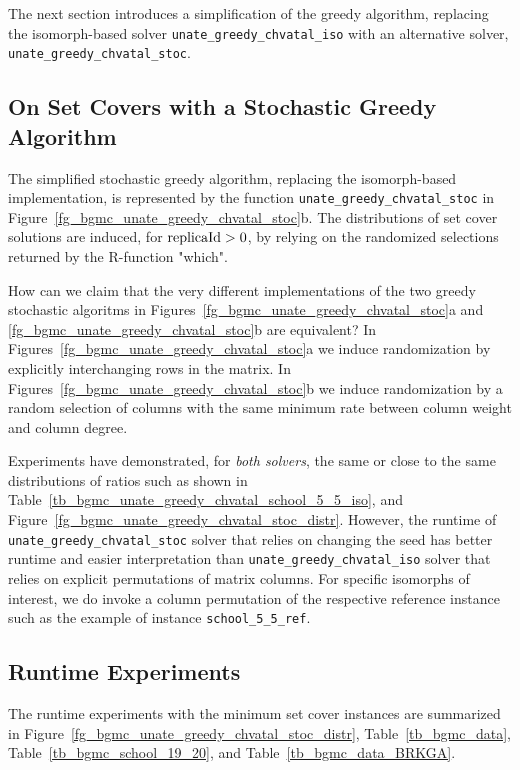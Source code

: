 The next section 
introduces a simplification of the greedy algorithm, 
replacing the isomorph-based solver  
{\tt unate\_greedy\_chvatal\_iso}
with an alternative solver,
{\tt unate\_greedy\_chvatal\_stoc}.

%
\subsection{{\sf On Set Covers with a Stochastic Greedy Algorithm}}
\noindent
The simplified stochastic greedy algorithm, 
replacing the isomorph-based implementation,
is represented by the function
{\tt unate\_greedy\_chvatal\_stoc} 
in Figure~\ref{fg_bgmc_unate_greedy_chvatal_stoc}b.
The distributions of set cover solutions are induced,
for ${\rm replicaId} > 0$, 
by relying on the randomized selections returned by the R-function "which".

How can we claim that the very different implementations 
of the two greedy stochastic algoritms in 
Figures~\ref{fg_bgmc_unate_greedy_chvatal_stoc}a and 
\ref{fg_bgmc_unate_greedy_chvatal_stoc}b are equivalent?
In Figures~\ref{fg_bgmc_unate_greedy_chvatal_stoc}a 
we induce randomization by explicitly interchanging rows
in the matrix.
In Figures~\ref{fg_bgmc_unate_greedy_chvatal_stoc}b
we induce randomization by a random selection of columns 
with the same minimum rate between column weight and column degree.

Experiments have demonstrated, for {\em both solvers}, 
the same or close to the same distributions
of ratios such as shown in 
Table~\ref{tb_bgmc_unate_greedy_chvatal_school_5_5_iso},
and
Figure~\ref{fg_bgmc_unate_greedy_chvatal_stoc_distr}.
However, the runtime of 
{\tt unate\_greedy\_chvatal\_stoc} solver that relies on changing the seed
has better  runtime and easier interpretation than
{\tt unate\_greedy\_chvatal\_iso} solver that
relies on explicit permutations of matrix columns.
For specific isomorphs of interest, 
we do invoke a column permutation of
the respective reference instance such as
the example of instance {\tt school\_5\_5\_ref}.
%
%
\subsection{{\sf Runtime Experiments}}
\noindent
The runtime experiments with the minimum set cover instances are summarized in
Figure~\ref{fg_bgmc_unate_greedy_chvatal_stoc_distr},
Table~\ref{tb_bgmc_data}, 
Table~\ref{tb_bgmc_school_19_20}, and
Table~\ref{tb_bgmc_data_BRKGA}.

